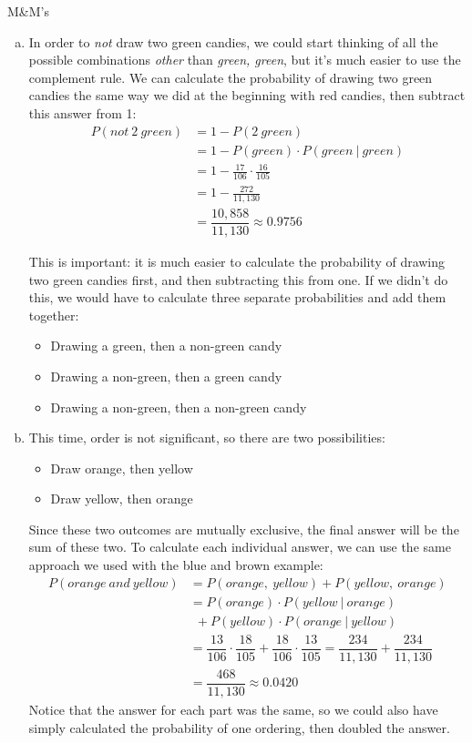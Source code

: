 \begin{example}[https://www.youtube.com/watch?v=j8BFTGwza9s&list=PLfmpjsIzhzts14-9s5QixRje97EI2oeMF&index=24]{M\&M's}
\begin{enumerate}[(a)]
\item In order to \emph{not} draw two green candies, we could start thinking of all the possible combinations \emph{other} than \emph{green, green}, but it's much easier to use the complement rule.  We can calculate the probability of drawing two green candies the same way we did at the beginning with red candies, then subtract this answer from 1:
\begin{align*}
P(not\ 2\ green) &= 1-P(2 \ green)\\
&= 1 - P(green) \cdot P(green \ | \ green)\\
&= 1-\frac{17}{106} \cdot \frac{16}{105}\\
&= 1 - \frac{272}{11,130}\\
&= \boxed{\dfrac{10,858}{11,130} \approx 0.9756}
\end{align*}

This is important: it is much easier to calculate the probability of drawing two green candies first, and then subtracting this from one.  If we didn't do this, we would have to calculate three separate probabilities and add them together:
\begin{itemize}
\item Drawing a green, then a non-green candy
\item Drawing a non-green, then a green candy
\item Drawing a non-green, then a non-green candy
\end{itemize}

\item This time, order is not significant, so there are two possibilities:
\begin{itemize}
\item Draw orange, then yellow
\item Draw yellow, then orange
\end{itemize}
Since these two outcomes are mutually exclusive, the final answer will be the sum of these two.  To calculate each individual answer, we can use the same approach we used with the blue and brown example:
\begin{align*}
P(orange\ and\ yellow) &= P(orange,\ yellow) + P(yellow,\ orange)\\
&= P(orange) \cdot P(yellow\ |\ orange)\\
&\ \ + P(yellow) \cdot P(orange\ |\ yellow)\\
&= \dfrac{13}{106} \cdot \dfrac{18}{105} + \dfrac{18}{106} \cdot \dfrac{13}{105} = \dfrac{234}{11,130} + \dfrac{234}{11,130}\\
&= \boxed{\dfrac{468}{11,130} \approx 0.0420}
\end{align*}
Notice that the answer for each part was the same, so we could also have simply calculated the probability of one ordering, then doubled the answer.
\end{enumerate}
\end{example}
